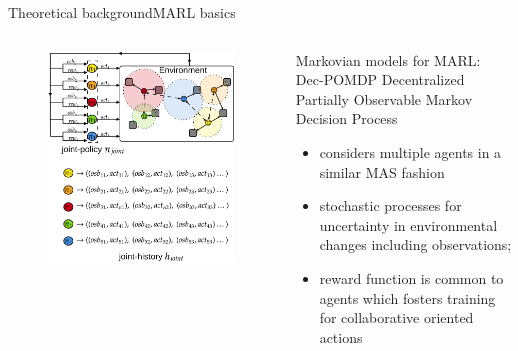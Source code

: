 \begin{frame}{Theoretical background}{MARL basics}

    \begin{columns}

        \hspace{-2ex}

        \begin{column}{0.4\textwidth}

            \begin{figure}
                \includegraphics[width=\linewidth]{figures/marl_basics.png}
            \end{figure}

        \end{column}

        \begin{column}{0.7\textwidth}

            \begin{block}{Markovian models for MARL: Dec-POMDP}
                Decentralized Partially Observable Markov Decision Process~\cite{Oliehoek2016}
                \begin{itemize}
                    \item considers multiple agents in a similar MAS fashion
                    \item stochastic processes for uncertainty in environmental changes including observations;
                    \item reward function is common to agents which fosters training for collaborative oriented actions~\cite{Beynier2013}
                \end{itemize}


\end{block}
\end{column}
\end{columns}
\end{frame}
